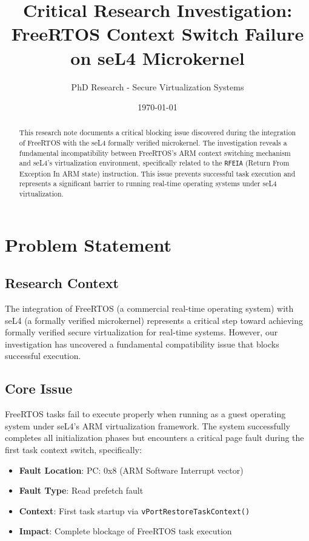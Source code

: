 \documentclass[11pt]{article}
\title{Critical Research Investigation: FreeRTOS Context Switch Failure on seL4 Microkernel}
\author{PhD Research - Secure Virtualization Systems}
\date{\today}
\begin{document}
\maketitle

\begin{abstract}
This research note documents a critical blocking issue discovered during the integration of FreeRTOS with the seL4 formally verified microkernel. The investigation reveals a fundamental incompatibility between FreeRTOS's ARM context switching mechanism and seL4's virtualization environment, specifically related to the \texttt{RFEIA} (Return From Exception In ARM state) instruction. This issue prevents successful task execution and represents a significant barrier to running real-time operating systems under seL4 virtualization.
\end{abstract}

\section{Problem Statement}

\subsection{Research Context}
The integration of FreeRTOS (a commercial real-time operating system) with seL4 (a formally verified microkernel) represents a critical step toward achieving formally verified secure virtualization for real-time systems. However, our investigation has uncovered a fundamental compatibility issue that blocks successful execution.

\subsection{Core Issue}
FreeRTOS tasks fail to execute properly when running as a guest operating system under seL4's ARM virtualization framework. The system successfully completes all initialization phases but encounters a critical page fault during the first task context switch, specifically:

\begin{itemize}
    \item \textbf{Fault Location}: PC: 0x8 (ARM Software Interrupt vector)
    \item \textbf{Fault Type}: Read prefetch fault 
    \item \textbf{Context}: First task startup via \texttt{vPortRestoreTaskContext()}
    \item \textbf{Impact}: Complete blockage of FreeRTOS task execution
\end{itemize}
\end{document}
